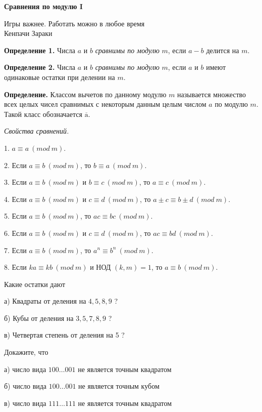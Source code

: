 \centerline{\bf \Huge Сравнения по модулю I}

\begin{flushright}
        \scriptsize{Игры важнее. Работать можно в любое время\\ Кенпачи Зараки}
\end{flushright}

\textbf{Определение 1.} Числа $a$ и $b$ \textit{сравнимы по модулю} $m$, если $a-b$ делится на $m$.

\textbf{Определение 2.} Числа $a$ и $b$ \textit{сравнимы по модулю} $m$, если $a$ и $b$ имеют одинаковые остатки при делении на $m$.

\textbf{Определение.} Классом вычетов по данному модулю $m$ называется множество всех целых чисел сравнимых с некоторым данным целым числом $a$ по модулю $m$. Такой класс обозначается $\overline{\mathrm{a}}$.

\centerline{\it Свойства сравнений.}

1. $a \equiv a\ (mod\ m)$.

2. Если $a \equiv b\ (mod\ m)$, то $b \equiv a\ (mod\ m)$.

3. Если $a \equiv b\ (mod\ m)$ и $b \equiv c\ (mod\ m)$, то $a \equiv c\ (mod\ m)$.

4. Если $a \equiv b\ (mod\ m)$ и $c \equiv d\ (mod\ m)$, то $a \pm c \equiv b \pm d\ (mod\ m)$.

5. Если $a \equiv b\ (mod\ m)$, то $a c \equiv b c\ (mod\ m)$.

6. Если $a \equiv b\ (mod\ m)$ и $c \equiv d\ (mod\ m)$, то $a c \equiv b d\ (mod\ m)$.

7. Если $a \equiv b\ (mod\ m)$, то $a^n \equiv b^n\ (mod\ m)$.

8. Если $k a \equiv k b\ (mod\ m)$ и НОД $(k, m)=1$, то $a \equiv b\ (mod\ m)$.

Какие остатки дают

а) Квадраты от деления на $4,5,8,9$ ?

б) Кубы от деления на $3,5,7,8,9$ ?

в) Четвертая степень от деления на 5 ?

Докажите, что

а) число вида $100 \ldots 001$ не является точным квадратом

б) число вида $100 \ldots 001$ не является точным кубом

в) число вида $111 \ldots 111$ не является точным квадратом

\newpage

